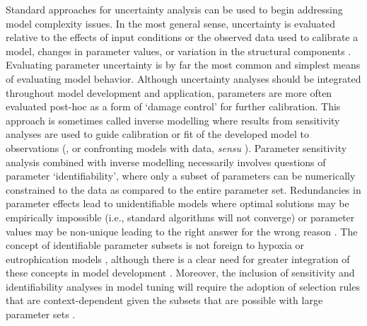 \documentclass[letterpaper,12pt,oneside]{article}\usepackage[]{graphicx}\usepackage[]{color}
\begin{document}
Standard approaches for uncertainty analysis can be used to begin addressing model complexity issues.  In the most general sense, uncertainty is evaluated relative to the effects of input conditions or the observed data used to calibrate a model, changes in parameter values, or variation in the structural components \citep{Beck87}.  Evaluating parameter uncertainty is by far the most common and simplest means of evaluating model behavior.  Although uncertainty analyses should be integrated throughout model development and application, parameters are more often evaluated post-hoc as a form of `damage control' for further calibration.  This approach is sometimes called inverse modelling where results from sensitivity analyses are used to guide calibration or fit of the developed model to observations (\citealt{Soetaert10}, or confronting models with data, \textit{sensu} \citealt{Hilborn97}).  Parameter sensitivity analysis combined with inverse modelling necessarily involves questions of parameter `identifiability', where only a subset of parameters can be numerically constrained to the data as compared to the entire parameter set.  Redundancies in parameter effects lead to unidentifiable models where optimal solutions may be empirically impossible (i.e., standard algorithms will not converge) or parameter values may be non-unique leading to the right answer for the wrong reason \citep{Kirchner06}.  The concept of identifiable parameter subsets is not foreign to hypoxia or eutrophication models  \citep{Omlin01,Estrada10,Mateus15}, although there is a clear need for greater integration of these concepts in model development \citep{Fasham06}.  Moreover, the inclusion of sensitivity and identifiability analyses in model tuning will require the adoption of selection rules that are context-dependent given the subsets that are possible with large parameter sets \citep[e.g.,][]{Wagener01, Wagener01b}.  
\end{document}
